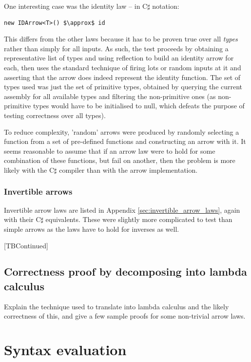 \documentclass[12pt,twoside,notitlepage]{report}
\begin{document}
One interesting case was the identity law -- in C$\sharp$ notation:

\begin{lstlisting}[mathescape]
new IDArrow<T>() $\approx$ id
\end{lstlisting}

This differs from the other laws because it has to be proven true over all \textit{types} rather than simply for all inputs. As such, the test proceeds by obtaining a representative list of types and using reflection to build an identity arrow for each, then uses the standard technique of firing lots or random inputs at it and asserting that the arrow does indeed represent the identity function. The set of types used was just the set of primitive types, obtained by querying the current assembly for all available types and filtering the non-primitive ones (as non-primitive types would have to be initialised to null, which defeats the purpose of testing correctness over all types).

To reduce complexity, 'random' arrows were produced by randomly selecting a function from a set of pre-defined functions and constructing an arrow with it. It seems reasonable to assume that if an arrow law were to hold for some combination of these functions, but fail on another, then the problem is more likely with the C$\sharp$ compiler than with the arrow implementation.

\subsubsection{Invertible arrows}

Invertible arrow laws are listed in Appendix \ref{sec:invertible_arrow_laws}, again with their C$\sharp$ equivalents. These were slightly more complicated to test than simple arrows as the laws have to hold for inverses as well.

[TBContinued]

\subsection{Correctness proof by decomposing into lambda calculus}

Explain the technique used to translate into lambda calculus and the likely correctness of this, and give a few sample proofs for some non-trivial arrow laws.

\section{Syntax evaluation}
\end{document}
